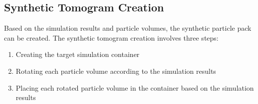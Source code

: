 \documentclass[preprint,12pt]{elsarticle}
\begin{document}
\subsection{Synthetic Tomogram Creation}
Based on the simulation results and particle volumes, the synthetic particle pack can be created. The synthetic tomogram creation involves three steps:
\begin{enumerate}
    \item Creating the target simulation container
    \item Rotating each particle volume according to the simulation results
    \item Placing each rotated particle volume in the container based on the simulation results
\end{enumerate}
\end{document}
